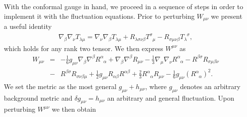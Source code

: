 With the conformal gauge in hand, we proceed in a sequence of steps in order to implement it with the fluctuation equations. Prior to perturbing $W_{\mu\nu}$ we present a useful identity
%
\begin{eqnarray}
\nabla_{\beta}\nabla_{\nu}T_{\lambda \mu}=\nabla_{\nu}\nabla_{\beta}T_{\lambda \mu}+R_{\lambda\sigma\nu\beta}T^{\sigma}_{\phantom{\sigma}\mu}-R_{\sigma\mu\nu\beta}T_{\lambda}^{\phantom{\lambda}\sigma},
\label{AP41}
\end{eqnarray}
%
which holds for any rank two tensor. We then express $W^{\mu\nu}$ as 
%                                                                               
\begin{eqnarray}
W_{\mu \nu}&=&
-\frac{1}{6}g_{\mu\nu}\nabla_{\beta}\nabla^{\beta}R^{\alpha}_{\phantom{\alpha}\alpha}
+\nabla_{\beta}\nabla^{\beta}R_{\mu\nu}                    
-\frac{1}{3}\nabla_{\mu}\nabla_{\nu}R^{\alpha}_{\phantom{\alpha}\alpha}  
-R^{\beta\sigma} R_{\sigma\mu\beta\nu}   
\nonumber\\
&-&R^{\beta\sigma} R_{\sigma\nu\beta\mu}  
+\frac{1}{2}g_{\mu\nu}R_{\alpha\beta}R^{\alpha\beta}                                            
+\frac{2}{3}R^{\alpha}_{\phantom{\alpha}\alpha}R_{\mu\nu}                              
-\frac{1}{6}g_{\mu\nu}(R^{\alpha}_{\phantom{\alpha}\alpha})^2.
\label{AP42}
\end{eqnarray}                                 
%
We set the metric as the most general $g_{\mu\nu}+h_{\mu\nu}$, where $g_{\mu\nu}$ denotes an arbitrary background metric and $\delta g_{\mu\nu}=h_{\mu\nu}$ an arbitrary and general fluctuation. Upon perturbing $W^{\mu\nu}$ we then obtain
%
